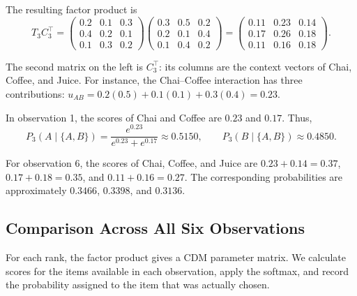 \documentclass[12pt,oneside]{report}
\begin{document}
The resulting factor product is
\begin{equation}
    T_3C_3^\top
    =
    \begin{pmatrix}
        0.2 & 0.1 & 0.3\\
        0.4 & 0.2 & 0.1\\
        0.1 & 0.3 & 0.2
    \end{pmatrix}
    \begin{pmatrix}
        0.3 & 0.5 & 0.2\\
        0.2 & 0.1 & 0.4\\
        0.1 & 0.4 & 0.2
    \end{pmatrix}
    =
    \begin{pmatrix}
        0.11 & 0.23 & 0.14\\
        0.17 & 0.26 & 0.18\\
        0.11 & 0.16 & 0.18
    \end{pmatrix}.
    \label{eq:rank-three-example-product}
\end{equation}

The second matrix on the left is $C_3^\top$:
its columns are the context vectors of Chai, Coffee,
and Juice. For instance, the Chai--Coffee interaction
has three contributions:
$u_{AB}=0.2(0.5)+0.1(0.1)+0.3(0.4)=0.23$.

In observation 1, the scores of Chai and Coffee are
$0.23$ and $0.17$. Thus,
\begin{equation}
    P_3(A\mid\{A,B\})
    =\frac{e^{0.23}}{e^{0.23}+e^{0.17}}
    \approx 0.5150,
    \qquad
    P_3(B\mid\{A,B\})\approx 0.4850.
    \label{eq:rank-three-first-choice}
\end{equation}

For observation 6, the scores of Chai, Coffee,
and Juice are $0.23+0.14=0.37$,
$0.17+0.18=0.35$, and $0.11+0.16=0.27$.
The corresponding probabilities are approximately
$0.3466$, $0.3398$, and $0.3136$.

\subsection{Comparison Across All Six Observations}

For each rank, the factor product gives a CDM parameter matrix. We calculate scores for the items available in
each observation, apply the softmax, and record the
probability assigned to the item that was actually
chosen.
\end{document}
